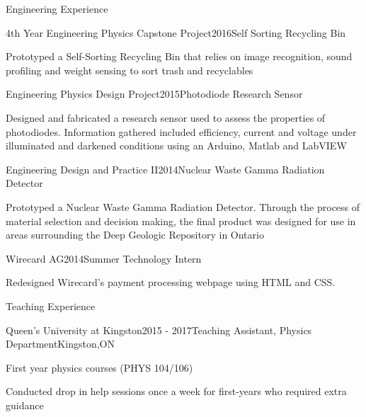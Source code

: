 \documentclass{resume2} %
\begin{document}

\begin{rSection}{Engineering Experience}
	
	\begin{rSubsection}{4th Year Engineering Physics Capstone Project}{2016}{Self Sorting Recycling Bin}{}
		\item Prototyped a Self-Sorting Recycling Bin that relies on image recognition, sound profiling and weight sensing to sort trash and recyclables
	\end{rSubsection}

	\begin{rSubsection}{Engineering Physics Design Project}{2015}{Photodiode Research Sensor}{}
		\item Designed and fabricated a research sensor used to assess the properties of photodiodes. Information gathered included efficiency, current and voltage under illuminated and darkened conditions using an Arduino, Matlab and LabVIEW
	\end{rSubsection}

	\begin{rSubsection}{Engineering Design and Practice II}{2014}{Nuclear Waste Gamma Radiation Detector}{}
		\item Prototyped a Nuclear Waste Gamma Radiation Detector. Through the process of material selection and decision making, the final product was designed for use in areas surrounding the Deep Geologic Repository in Ontario
	\end{rSubsection}

	\begin{rSubsection}{Wirecard AG}{2014}{Summer Technology Intern}{}
	\item Redesigned Wirecard's payment processing webpage using HTML and CSS. 
\end{rSubsection}
	
\end{rSection}


\begin{rSection}{Teaching Experience}
	
	\begin{rSubsection}{Queen's University at Kingston}{2015 - 2017}{Teaching Assistant, Physics Department}{Kingston,ON}
		\item First year physics courses (PHYS 104/106)
		\item Conducted drop in help sessions once a week for first-years who required extra guidance
	\end{rSubsection}

\end{rSection}
\end{document}
